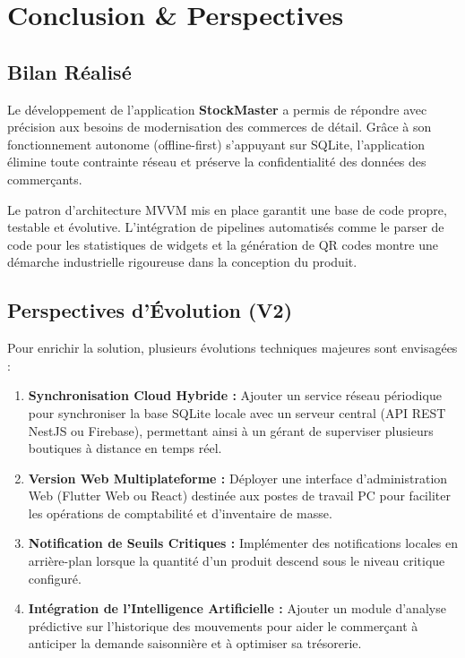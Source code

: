 \documentclass[12pt,a4paper]{report}
\begin{document}
\chapter{Conclusion \& Perspectives}

\section{Bilan Réalisé}
Le développement de l'application \textbf{StockMaster} a permis de répondre avec précision aux besoins de modernisation des commerces de détail. Grâce à son fonctionnement autonome (offline-first) s'appuyant sur SQLite, l'application élimine toute contrainte réseau et préserve la confidentialité des données des commerçants.

Le patron d'architecture MVVM mis en place garantit une base de code propre, testable et évolutive. L'intégration de pipelines automatisés comme le parser de code pour les statistiques de widgets et la génération de QR codes montre une démarche industrielle rigoureuse dans la conception du produit.

\section{Perspectives d'Évolution (V2)}
Pour enrichir la solution, plusieurs évolutions techniques majeures sont envisagées :
\begin{enumerate}
    \item \textbf{Synchronisation Cloud Hybride :} Ajouter un service réseau périodique pour synchroniser la base SQLite locale avec un serveur central (API REST NestJS ou Firebase), permettant ainsi à un gérant de superviser plusieurs boutiques à distance en temps réel.
    \item \textbf{Version Web Multiplateforme :} Déployer une interface d'administration Web (Flutter Web ou React) destinée aux postes de travail PC pour faciliter les opérations de comptabilité et d'inventaire de masse.
    \item \textbf{Notification de Seuils Critiques :} Implémenter des notifications locales en arrière-plan lorsque la quantité d'un produit descend sous le niveau critique configuré.
    \item \textbf{Intégration de l'Intelligence Artificielle :} Ajouter un module d'analyse prédictive sur l'historique des mouvements pour aider le commerçant à anticiper la demande saisonnière et à optimiser sa trésorerie.
\end{enumerate}
\end{document}
